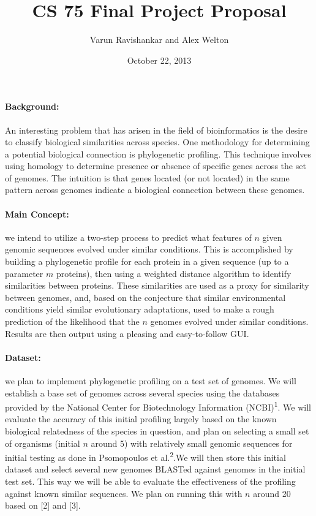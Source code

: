 \documentclass[11pt, oneside]{article}
\title{CS 75 Final Project Proposal}
\author{Varun Ravishankar and Alex Welton}
\date{October 22, 2013}
\begin{document}
\maketitle

\paragraph
{\bfseries Background:} An interesting problem that has arisen in the field of bioinformatics is the desire to classify biological similarities across species. One methodology for determining a potential biological connection is phylogenetic profiling. This technique involves using homology to determine presence or absence of specific genes across the set of genomes. The intuition is that genes located (or not located) in the same pattern across genomes indicate a biological connection between these genomes.

\paragraph
{\bfseries Main Concept:} we intend to utilize a two-step process to predict what features of $n$ given genomic sequences evolved under similar conditions. This is accomplished by building a phylogenetic profile for each protein in a given sequence (up to a parameter $m$ proteins), then using a weighted distance algorithm to identify similarities between proteins. These similarities are used as a proxy for similarity between genomes, and, based on the conjecture that similar environmental conditions yield similar evolutionary adaptations, used to make a rough prediction of the likelihood that the $n$ genomes evolved under similar conditions. Results are then output using a pleasing and easy-to-follow GUI.

\paragraph
{\bfseries Dataset:} we plan to implement phylogenetic profiling on a test set of genomes. We will establish a base set of genomes across several species using the databases provided by the National Center for Biotechnology Information (NCBI)\textsuperscript{1}. We will evaluate the accuracy of this initial profiling largely based on the known biological relatedness of the species in question, and plan on selecting a small set of organisms (initial $n$ around 5)  with relatively small genomic sequences for initial testing as done in Psomopoulos et al.\textsuperscript{2}.We will then store this initial dataset and select several new genomes BLASTed against genomes in the initial test set. This way we will be able to evaluate the effectiveness of the profiling against known similar sequences. We plan on running this with $n$ around 20 based on [2] and [3].
\end{document}
